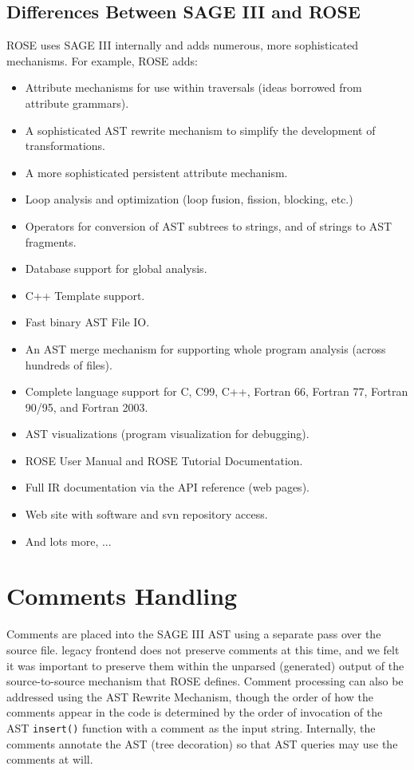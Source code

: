 \subsection{Differences Between SAGE III and ROSE}
   ROSE uses SAGE III internally and adds numerous, more sophisticated mechanisms.
For example, ROSE adds:
\begin{itemize}
    \item Attribute mechanisms for use within traversals (ideas borrowed 
          from attribute grammars).
    \item A sophisticated AST rewrite mechanism to simplify the development 
          of transformations.
    \item A more sophisticated persistent attribute mechanism.
    \item Loop analysis and optimization (loop fusion, fission, blocking, etc.)
    \item Operators for conversion of AST subtrees to strings, and of strings 
          to AST fragments.
    \item Database support for global analysis.
    \item C++ Template support.
    \item Fast binary AST File I\/O.
    \item An AST merge mechanism for supporting whole program analysis
          (across hundreds of files).
    \item Complete language support for C, C99, C++, Fortran 66, Fortran 77, 
          Fortran 90/95, and Fortran 2003.
    \item AST visualizations (program visualization for debugging).
    \item ROSE User Manual and ROSE Tutorial Documentation.
    \item Full IR documentation via the API reference (web pages).
    \item Web site with software and svn repository access.
    \item And lots more, ...
\end{itemize}

\section {Comments Handling}

    Comments are placed into the SAGE III AST using a separate pass over the source file.
legacy frontend does not preserve comments at this time, and we felt it was important to preserve them
within the unparsed (generated) output of the source-to-source mechanism that ROSE defines.
Comment processing can also be addressed using the AST Rewrite Mechanism, though
the order of how the comments appear in the code is determined by the order of 
invocation of the AST {\tt insert()} function with a comment as the input string.
Internally, the comments annotate the AST (tree decoration) so that AST queries may use 
the comments at will.

